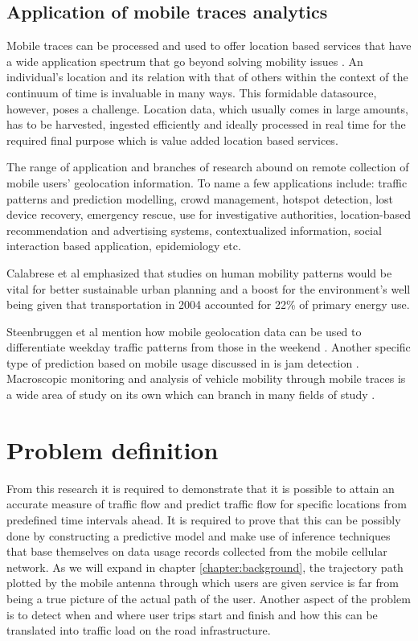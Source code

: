 \documentclass[12pt, a4paper]{report}
\theoremstyle{definition}
\theoremstyle{definition}%
\theoremstyle{definition}%
\theoremstyle{definition}%
\theoremstyle{definition}%
\theoremstyle{definition}%
\begin{document}
\subsection{Application of mobile traces analytics} \label{section:introduction:application_mobile_traces}

Mobile traces can be processed and used to offer location based services that have a wide application spectrum that go beyond solving mobility issues \cite{Hoteit2014,Calabrese2013,Gonzalez2008,Hoteit2016}. An individual's location and its relation with that of others within the context of the continuum of time is invaluable in many ways. This formidable datasource, however, poses a challenge. Location data, which usually comes in large amounts, has to be harvested, ingested efficiently and ideally processed in real time for the required final purpose which is value added location based services.

The range of application and branches of research abound on remote collection of mobile users' geolocation information.   To name a few applications include: traffic patterns and prediction modelling, crowd management, hotspot detection, lost device recovery, emergency rescue, use for investigative authorities,  location-based recommendation and advertising systems, contextualized information, social interaction based application, epidemiology etc.  

Calabrese et al  emphasized that studies on human mobility patterns would be vital for better sustainable urban planning and a boost for the environment's well being given that transportation in 2004 accounted for 22\% of primary energy use\cite{Calabrese2013}.

Steenbruggen et al mention how mobile geolocation data can be used to differentiate weekday traffic patterns from those in the weekend \cite{Steenbruggen2015}. Another specific type of  prediction based on mobile usage discussed in \cite{Hoteit2014} is jam detection .  Macroscopic monitoring and analysis of vehicle mobility through mobile traces is a wide area of study on its own which can branch in many fields of study \cite{Steenbruggen2015}.


\section{Problem definition}
From this research it is required to demonstrate that it is possible to attain an accurate measure of traffic flow and predict traffic flow for specific locations from predefined time intervals ahead. It is required to prove that this can be possibly done by constructing a predictive model and make use of inference techniques that base themselves on data usage records collected from the mobile cellular network. As we will expand in chapter \ref{chapter:background}, the trajectory path plotted by the mobile antenna through which users are given service is far from being a true picture of the actual path of the user.  Another aspect of the problem is to detect when and where user trips start and finish and how this can be translated into traffic load on the road infrastructure.
\end{document}
